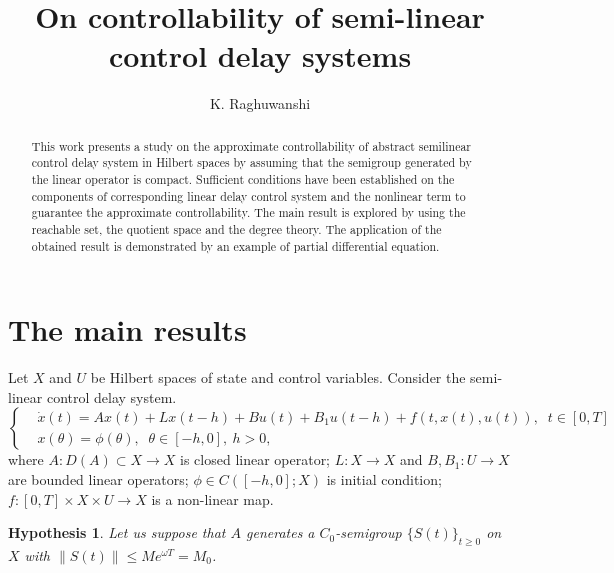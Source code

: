 \documentclass[12pt]{llncs}
\newtheorem{hp}{Hypothesis}
\begin{document}
\fi
%
\title{On controllability of semi-linear control delay systems
}
\author{K. Raghuwanshi}

\maketitle

\begin{abstract}
This work presents a study on the approximate controllability of abstract semilinear control delay system in Hilbert spaces by assuming that the semigroup generated by the linear operator is compact. Sufficient conditions have been established on the components of corresponding linear delay control system and the nonlinear term to guarantee the approximate controllability. The main result is explored by using the reachable set, the quotient space and the degree theory. The application of the obtained result is demonstrated by an example of partial differential equation.
\end{abstract}

\section{The main results}
Let $X$ and $U$ be Hilbert spaces of state and control variables. Consider the semi-linear control delay system.
\begin{equation}\label{eqn-main-syst}
	\left\{
	\begin{aligned}
		& \dot{x}(t)=Ax(t)+Lx(t-h)+B u(t)+B_1 u(t-h)+f(t,x(t),u(t)), \;\;t \in[0,T]  \\
		& x(\theta)=\phi(\theta), \;\; \theta \in [-h,0],  ~ h>0,
	\end{aligned}
	\right.	
\end{equation}
where $ A:D(A) \subset X \rightarrow X$ is closed linear operator; $ L:X \rightarrow X $ and $B, B_1: U \rightarrow X $ are bounded linear operators; $ \phi \in C \left( [-h,0];X \right)$ is initial condition; $f:[0,T]\times X \times U \rightarrow X  $ is a non-linear map.

\begin{hp}\label{A1}
Let us suppose that $A$ generates a $C_0$-semigroup $\{S(t)\}_{t\ge 0}$ on $X$ with $\|S(t)\| \le Me^{\omega T} = M_0$.
\end{hp}
\end{document}
